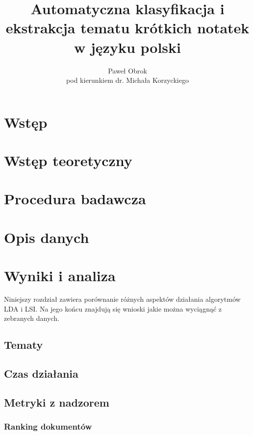 \documentclass[11pt,a4paper]{article}
\begin{document}
\title{Automatyczna klasyfikacja i ekstrakcja tematu krótkich notatek w języku polski}
\author{Paweł Obrok\\pod kierunkiem dr. Michała Korzyckiego}

\maketitle
\pagebreak

\tableofcontents
\pagebreak

\section{Wstęp}
\section{Wstęp teoretyczny}
\section{Procedura badawcza}
\section{Opis danych}
\section{Wyniki i analiza}

Niniejszy rozdział zawiera porównanie różnych aspektów działania algorytmów LDA
i LSI. Na jego końcu znajdują się wnioski jakie można wyciągnąć z zebranych
danych.

\subsection{Tematy}

\subsection{Czas działania}

\subsection{Metryki z nadzorem}

\subsubsection{Ranking dokumentów}
\end{document}
